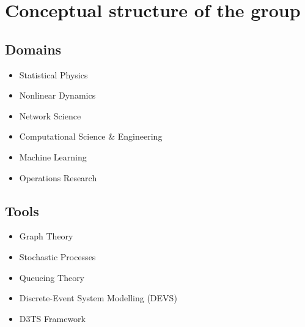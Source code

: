 \section*{Conceptual structure of the group}

\subsection*{Domains}
\begin{itemize}
\item Statistical Physics
\item Nonlinear Dynamics
\item Network Science
\item Computational Science & Engineering
\item Machine Learning
\item Operations Research
\end{itemize}

\subsection*{Tools}
\begin{itemize}
\item Graph Theory
\item Stochastic Processes
\item Queueing Theory
\item Discrete-Event System Modelling (DEVS)
\item D3TS Framework
\end{itemize}